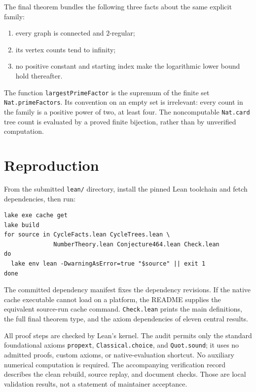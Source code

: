 \documentclass[11pt]{article}
\begin{document}
The final theorem bundles the following three facts about the same explicit family:
\begin{enumerate}
\item every graph is connected and $2$-regular;
\item its vertex counts tend to infinity;
\item no positive constant and starting index make the logarithmic lower bound hold thereafter.
\end{enumerate}

The function \texttt{largestPrimeFactor} is the supremum of the finite set \texttt{Nat.primeFactors}. Its convention on an empty set is irrelevant: every count in the family is a positive power of two, at least four. The noncomputable \texttt{Nat.card} tree count is evaluated by a proved finite bijection, rather than by unverified computation.

\section{Reproduction}
From the submitted \texttt{lean/} directory, install the pinned Lean toolchain and fetch dependencies, then run:
\begin{verbatim}
lake exe cache get
lake build
for source in CycleFacts.lean CycleTrees.lean \
              NumberTheory.lean Conjecture464.lean Check.lean
do
  lake env lean -DwarningAsError=true "$source" || exit 1
done
\end{verbatim}
The committed dependency manifest fixes the dependency revisions. If the native cache executable cannot load on a platform, the README supplies the equivalent source-run cache command. \texttt{Check.lean} prints the main definitions, the full final theorem type, and the axiom dependencies of eleven central results.

All proof steps are checked by Lean's kernel. The audit permits only the standard foundational axioms \texttt{propext}, \texttt{Classical.choice}, and \texttt{Quot.sound}; it uses no admitted proofs, custom axioms, or native-evaluation shortcut. No auxiliary numerical computation is required. The accompanying verification record describes the clean rebuild, source replay, and document checks. Those are local validation results, not a statement of maintainer acceptance.
\end{document}
